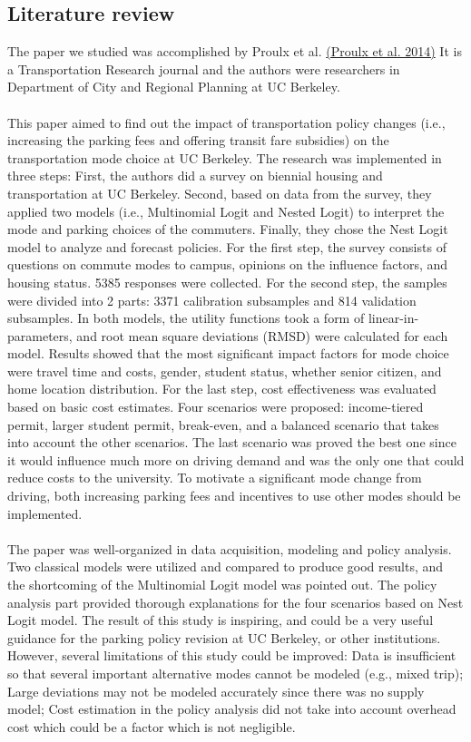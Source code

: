 \documentclass[12pt]{article}
\begin{document}
\subsection{Literature review}
\onehalfspacing
The paper we studied was accomplished by Proulx et al. \hyperref[ref:Pr]{(Proulx et al. 2014)} It is a Transportation Research journal and the authors were researchers in Department of City and Regional Planning at UC Berkeley.\\\\
This paper aimed to find out the impact of transportation policy changes (i.e., increasing the parking fees and offering transit fare subsidies) on the transportation mode choice at UC Berkeley. The research was implemented in three steps: First, the authors did a survey on biennial housing and transportation at UC Berkeley. Second, based on data from the survey, they applied two models (i.e., Multinomial Logit and Nested Logit) to interpret the mode and parking choices of the commuters. Finally, they chose the Nest Logit model to analyze and forecast policies. For the first step, the survey consists of questions on commute modes to campus, opinions on the influence factors, and housing status. 5385 responses were collected. For the second step, the samples were divided into 2 parts: 3371 calibration subsamples and 814 validation subsamples. In both models, the utility functions took a form of linear-in-parameters, and root mean square deviations (RMSD) were calculated for each model. Results showed that the most significant impact factors for mode choice were travel time and costs, gender, student status, whether senior citizen, and home location distribution. For the last step, cost effectiveness was evaluated based on basic cost estimates. Four scenarios were proposed: income-tiered permit, larger student permit, break-even, and a balanced scenario that takes into account the other scenarios. The last scenario was proved the best one since it would influence much more on driving demand and was the only one that could reduce costs to the university. To motivate a significant mode change from driving, both increasing parking fees and incentives to use other modes should be implemented.\\\\
The paper was well-organized in data acquisition, modeling and policy analysis. Two classical models were utilized and compared to produce good results, and the shortcoming of the Multinomial Logit model was pointed out. The policy analysis part provided thorough explanations for the four scenarios based on Nest Logit model. The result of this study is inspiring, and could be a very useful guidance for the parking policy revision at UC Berkeley, or other institutions. However, several limitations of this study could be improved: Data is insufficient so that several important alternative modes cannot be modeled (e.g., mixed trip); Large deviations may not be modeled accurately since there was no supply model; Cost estimation in the policy analysis did not take into account overhead cost which could be a factor which is not negligible.\\\\
\end{document}
